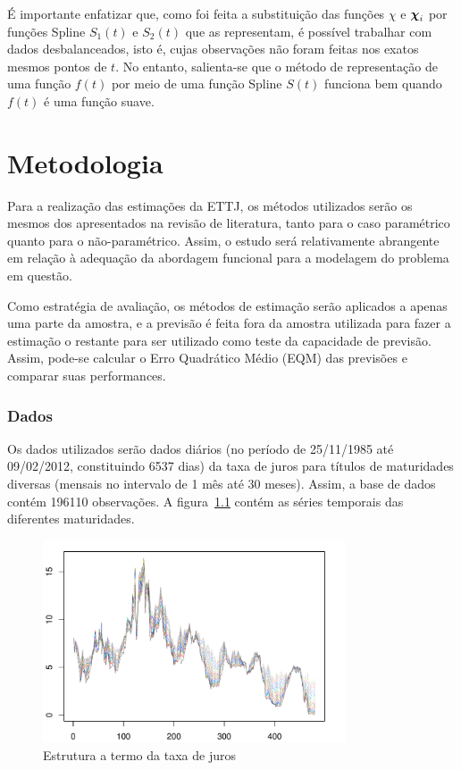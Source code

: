 \documentclass[
	12pt,				%
	openright,			%
	oneside,			%
	a4paper,			%
	english,			%
	brazil				%
	]{dissertacao-ufrgs-abntex2}
\begin{document}
É importante enfatizar que, como foi feita a substituição das funções
$\chi$ e $\boldsymbol{\chi}_{i}$ por funções Spline $S_{1}(t)$ e $S_{2}(t)$
que as representam, é possível trabalhar com dados desbalanceados,
isto é, cujas observações não foram feitas nos exatos mesmos pontos
de $t$. No entanto, salienta-se que o método de representação de
uma função $f(t)$ por meio de uma função Spline $S(t)$ funciona
bem quando $f(t)$ é uma função suave.



\chapter{Metodologia}

Para a realização das estimações da ETTJ, os métodos utilizados serão os mesmos dos apresentados na revisão de literatura, tanto para o caso paramétrico quanto para o não-paramétrico. Assim, o estudo será relativamente abrangente em relação à adequação da abordagem funcional para a modelagem do problema em questão.

Como estratégia de avaliação, os métodos de estimação serão aplicados a apenas uma parte da amostra, e a previsão é feita fora da amostra utilizada para fazer a estimação o restante para ser utilizado como teste da capacidade de previsão. Assim, pode-se calcular o Erro Quadrático Médio (EQM) das previsões e comparar suas performances. 

\subsection*{Dados}

Os dados utilizados serão dados diários (no período de 25/11/1985 até 09/02/2012, constituindo 6537 dias) da taxa de juros para títulos de maturidades diversas (mensais no intervalo de 1 mês até 30 meses). Assim, a base de dados contém 196110 observações. A figura~\ref{fig-est-termo} contém as séries temporais das diferentes maturidades.
\begin{figure}[h!] \label{fig-est-termo}
  \centering
    \includegraphics[width=0.8\textwidth]{anexos/taxas_juro}
  \caption{Estrutura a termo da taxa de juros}
\end{figure}
\end{document}
